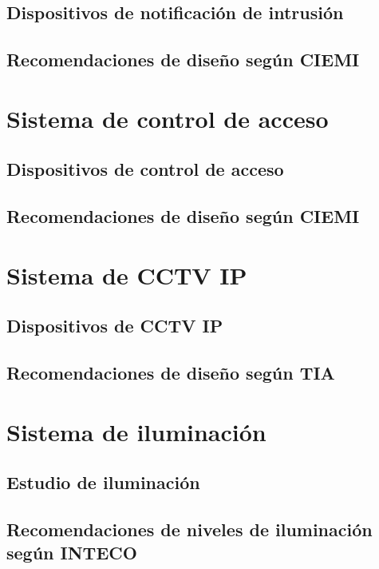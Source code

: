 \subsection{Dispositivos de notificación de intrusión}

\subsection{Recomendaciones de diseño según CIEMI}


\newpage


\section{Sistema de control de acceso}


\subsection{Dispositivos de control de acceso}

\subsection{Recomendaciones de diseño según CIEMI}


\newpage


\section{Sistema de CCTV IP}


\subsection{Dispositivos de CCTV IP}

\subsection{Recomendaciones de diseño según TIA}


\newpage


\section{Sistema de iluminación}


\subsection{Estudio de iluminación}

\subsection{Recomendaciones de niveles de iluminación según INTECO}

